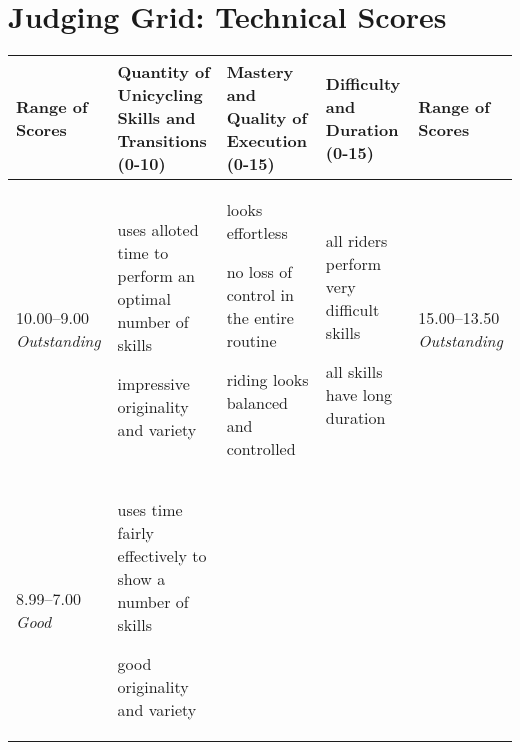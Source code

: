 \section{Judging Grid: Technical Scores}
\begin{minipage}{\textwidth}
\begingroup
    \fontsize{7pt}{9pt}\selectfont
\setlength{\LTleft}{-2.5cm} 
\begin{longtable}{|p{1.5cm}|p{5cm}|p{5cm}|p{5cm}|p{1.5cm}|}
\hline
\textbf{Range of Scores} &
\textbf{Quantity of Unicycling Skills and \newline Transitions (0-10)} &
\textbf{Mastery and Quality of Execution \newline (0-15)} &
\textbf{Difficulty and Duration \newline (0-15)} &
\textbf{Range of Scores} \\
\hline
10.00--9.00 \newline
\emph{Outstanding} &

\begin{judging_items}%
\item uses alloted time to perform an optimal number of skills
\item impressive originality and variety
\end{judging_items} &

\begin{judging_items}%
\item looks effortless
\item no loss of control in the entire routine
\item riding looks balanced and controlled
\end{judging_items} &

\begin{judging_items}%
\item all riders perform very difficult skills
\item all skills have long duration
\end{judging_items} &

15.00--13.50 \newline
\emph{Outstanding} \\
\hline

8.99--7.00 \newline
\emph{Good} &

\begin{judging_items}%
\item uses time fairly effectively to show a number of skills
\item good originality and variety
\end{judging_items} &


\end{longtable}
\end{minipage}
